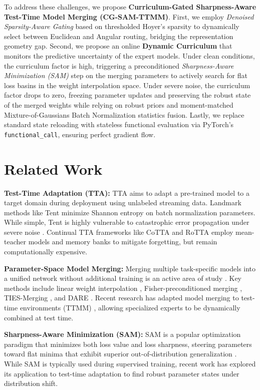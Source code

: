 \documentclass{article}
\theoremstyle{plain}
\theoremstyle{definition}
\theoremstyle{remark}
\begin{document}
To address these challenges, we propose \textbf{Curriculum-Gated Sharpness-Aware Test-Time Model Merging (CG-SAM-TTMM)}. First, we employ \emph{Denoised Sparsity-Aware Gating} based on thresholded Hoyer's sparsity \cite{hoyer2004non} to dynamically select between Euclidean and Angular routing, bridging the representation geometry gap. Second, we propose an online \textbf{Dynamic Curriculum} that monitors the predictive uncertainty of the expert models. Under clean conditions, the curriculum factor is high, triggering a preconditioned \emph{Sharpness-Aware Minimization (SAM)} \cite{foret2021sharpnessaware} step on the merging parameters to actively search for flat loss basins in the weight interpolation space. Under severe noise, the curriculum factor drops to zero, freezing parameter updates and preserving the robust state of the merged weights while relying on robust priors and moment-matched Mixture-of-Gaussians Batch Normalization statistics fusion. Lastly, we replace standard state reloading with stateless functional evaluation via PyTorch's \texttt{functional\_call}, ensuring perfect gradient flow.

\section{Related Work}
\label{sec:related}

\textbf{Test-Time Adaptation (TTA):} TTA aims to adapt a pre-trained model to a target domain during deployment using unlabeled streaming data. Landmark methods like Tent \cite{wang2021tent} minimize Shannon entropy on batch normalization parameters. While simple, Tent is highly vulnerable to catastrophic error propagation under severe noise \cite{liang2020we}. Continual TTA frameworks like CoTTA \cite{wang2022cotta} and RoTTA \cite{niu2022rotta} employ mean-teacher models and memory banks to mitigate forgetting, but remain computationally expensive.

\textbf{Parameter-Space Model Merging:} Merging multiple task-specific models into a unified network without additional training is an active area of study \cite{wortsman2022robust}. Key methods include linear weight interpolation \cite{wortsman2022robust}, Fisher-preconditioned merging \cite{matena2022merging}, TIES-Merging \cite{yadav2023ties}, and DARE \cite{jordan2023dare}. Recent research has adapted model merging to test-time environments (TTMM) \cite{bk_comerge, cp_am}, allowing specialized experts to be dynamically combined at test time.

\textbf{Sharpness-Aware Minimization (SAM):} SAM is a popular optimization paradigm that minimizes both loss value and loss sharpness, steering parameters toward flat minima that exhibit superior out-of-distribution generalization \cite{foret2021sharpnessaware, izmailov2018averaging}. While SAM is typically used during supervised training, recent work has explored its application to test-time adaptation \cite{ribera2023testtime} to find robust parameter states under distribution shift.
\end{document}
